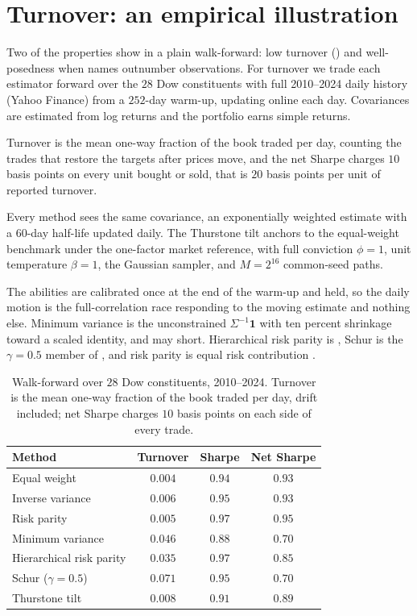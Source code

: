 \section{Turnover: an empirical illustration}
\label{sec:experiments}

Two of the properties show in a plain walk-forward: low turnover () and well-posedness when names outnumber
observations.
For turnover we trade each estimator forward over the $28$ Dow
constituents with full 2010--2024 daily history (Yahoo Finance) from a $252$-day
warm-up, updating online each day.
Covariances are estimated from log returns and
the portfolio earns simple returns.

Turnover is the mean one-way fraction of the
book traded per day, counting the trades that restore the targets after prices
move, and the net Sharpe charges $10$ basis points on every unit bought or sold,
that is $20$ basis points per unit of reported turnover.

Every method sees the same covariance, an exponentially weighted estimate with a
$60$-day half-life updated daily.
The Thurstone tilt anchors to the equal-weight
benchmark under the one-factor market reference, with full conviction $\phi = 1$,
unit temperature $\beta = 1$, the Gaussian sampler, and $M = 2^{16}$ common-seed
paths.

The abilities are calibrated once at the end of the warm-up and held, so
the daily motion is the full-correlation race responding to the moving estimate
and nothing else.
Minimum variance is the unconstrained $\Sigma^{-1}\mathbf 1$
with ten percent shrinkage toward a scaled identity, and may short.
Hierarchical
risk parity is \textcite{lopezdeprado2016}, Schur is the $\gamma = 0.5$ member of
\textcite{cotton2024schur}, and risk parity is equal risk contribution
\parencite{maillard2010}.

\begin{table}[h]
  \centering
  \caption{Walk-forward over $28$ Dow constituents, 2010--2024. Turnover is the
  mean one-way fraction of the book traded per day, drift included; net Sharpe
  charges $10$ basis points on each side of every trade.}
  \label{tab:dow}
  \begin{tabular}{lccc}
    \toprule
    Method & Turnover & Sharpe & Net Sharpe \\
    \midrule
    Equal weight              & $0.004$ & $0.94$ & $0.93$ \\
    Inverse variance          & $0.006$ & $0.95$ & $0.93$ \\
    Risk parity               & $0.005$ & $0.97$ & $0.95$ \\
    Minimum variance          & $0.046$ & $0.88$ & $0.70$ \\
    Hierarchical risk parity  & $0.035$ & $0.97$ & $0.85$ \\
    Schur ($\gamma=0.5$)      & $0.071$ & $0.95$ & $0.70$ \\
    Thurstone tilt            & $0.008$ & $0.91$ & $0.89$ \\
    \bottomrule
  \end{tabular}
\end{table}

